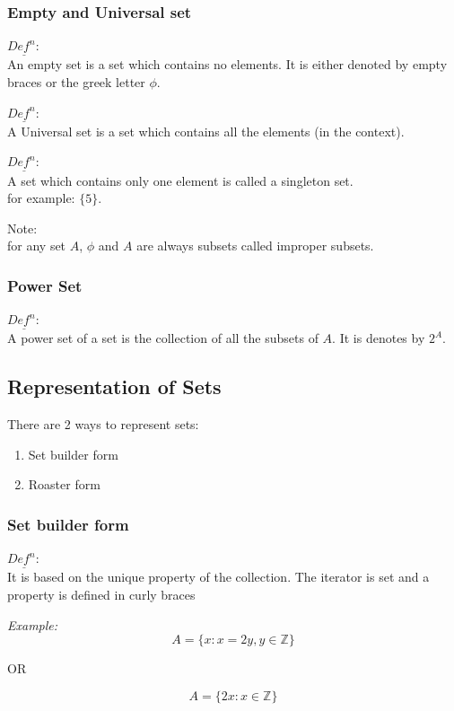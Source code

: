 \documentclass[11pt,letterpaper]{article}
\newenvironment{example}                             
        {\textit{Example:}\\}
	{}
\newenvironment{definition}
	{\begin{mdframed}$\underline{\textit{Def}^\textit{n}:} $\\}
	{\end{mdframed}}
\begin{document}
\subsubsection{Empty and Universal set}
\begin{definition}
  An empty set is a set which contains no elements. It is either denoted by empty braces or the greek letter $\phi$.
\end{definition}
\begin{definition}
  A Universal set is a set which contains all the elements (in the context). 
\end{definition}
\begin{definition}
  A set which contains only one element is called a singleton set. \\ 
  for example: $\{5\}$.
\end{definition}

Note: \\
for any set $A$, $\phi$ and $A$ are always subsets called improper subsets. 

\subsubsection{Power Set}
\begin{definition}
  A power set of a set is the collection of all the subsets of $A$. It is denotes by $2^A$.
\end{definition}

\subsection{Representation of Sets}
There are 2 ways to represent sets:
\begin{enumerate}
  \item Set builder form 
  \item Roaster form
\end{enumerate}

\subsubsection{Set builder form}
\begin{definition}
  It is based on the unique property of the collection. The iterator is set and a property is defined in curly braces
\end{definition}
\begin{example}
  \[
    A = \{x: x = 2y, y \in \mathbb{Z}\}
  \]
  \begin{center}
    OR
  \end{center}
  \[
    A = \{2x: x \in \mathbb{Z}\}
  \]
\end{example}
\end{document}
